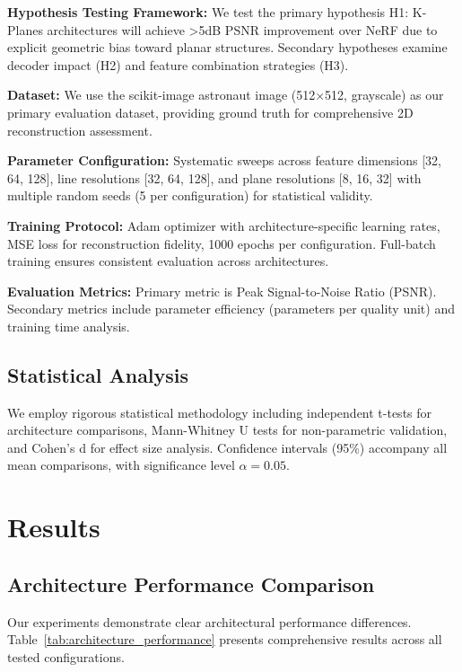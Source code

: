 \documentclass{article}
\begin{document}
\textbf{Hypothesis Testing Framework:} We test the primary hypothesis H1: K-Planes architectures will achieve >5dB PSNR improvement over NeRF due to explicit geometric bias toward planar structures. Secondary hypotheses examine decoder impact (H2) and feature combination strategies (H3).

\textbf{Dataset:} We use the scikit-image astronaut image (512×512, grayscale) as our primary evaluation dataset, providing ground truth for comprehensive 2D reconstruction assessment.

\textbf{Parameter Configuration:} Systematic sweeps across feature dimensions [32, 64, 128], line resolutions [32, 64, 128], and plane resolutions [8, 16, 32] with multiple random seeds (5 per configuration) for statistical validity.

\textbf{Training Protocol:} Adam optimizer with architecture-specific learning rates, MSE loss for reconstruction fidelity, 1000 epochs per configuration. Full-batch training ensures consistent evaluation across architectures.

\textbf{Evaluation Metrics:} Primary metric is Peak Signal-to-Noise Ratio (PSNR). Secondary metrics include parameter efficiency (parameters per quality unit) and training time analysis.

\subsection{Statistical Analysis}

We employ rigorous statistical methodology including independent t-tests for architecture comparisons, Mann-Whitney U tests for non-parametric validation, and Cohen's d for effect size analysis. Confidence intervals (95\%) accompany all mean comparisons, with significance level $\alpha = 0.05$.

\section{Results}

\subsection{Architecture Performance Comparison}

Our experiments demonstrate clear architectural performance differences. Table~\ref{tab:architecture_performance} presents comprehensive results across all tested configurations.
\end{document}

